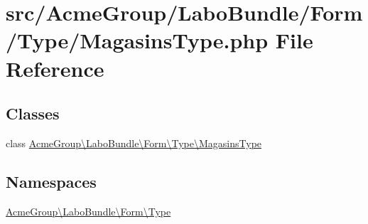 \hypertarget{_magasins_type_8php}{\section{src/\+Acme\+Group/\+Labo\+Bundle/\+Form/\+Type/\+Magasins\+Type.php File Reference}
\label{_magasins_type_8php}
}
\subsection*{Classes}
\begin{DoxyCompactItemize}
\item 
class \hyperlink{class_acme_group_1_1_labo_bundle_1_1_form_1_1_type_1_1_magasins_type}{Acme\+Group\textbackslash{}\+Labo\+Bundle\textbackslash{}\+Form\textbackslash{}\+Type\textbackslash{}\+Magasins\+Type}
\end{DoxyCompactItemize}
\subsection*{Namespaces}
\begin{DoxyCompactItemize}
\item 
 \hyperlink{namespace_acme_group_1_1_labo_bundle_1_1_form_1_1_type}{Acme\+Group\textbackslash{}\+Labo\+Bundle\textbackslash{}\+Form\textbackslash{}\+Type}
\end{DoxyCompactItemize}
